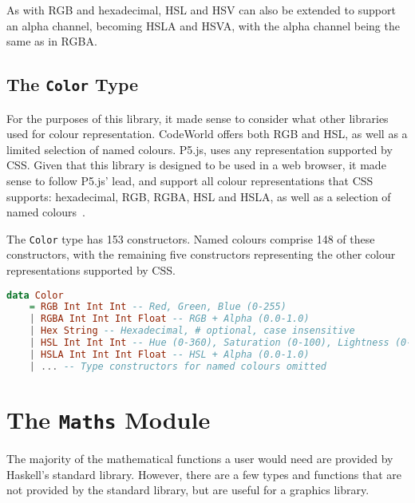 \documentclass[../main.tex]{subfiles}
\begin{document}
                As with RGB and hexadecimal, HSL and HSV can also be extended to support an
                    alpha channel, becoming HSLA and HSVA, with the alpha channel being the same as
                    in RGBA.

        \subsection{The \texttt{Color}
            Type} For the purposes of this library, it made sense to consider what other
                libraries used for colour representation.
            CodeWorld offers both RGB and HSL, as well as a limited selection of named
                colours.
            P5.js, uses any representation supported by CSS.
            Given that this library is designed to be used in a web browser, it made sense
                to follow P5.js' lead, and support all colour representations that CSS
                supports: hexadecimal, RGB, RGBA, HSL and HSLA, as well as a selection of named
                colours~\citep{cssColours}.

            The \texttt{Color} type has 153 constructors.
            Named colours comprise 148 of these constructors, with the remaining five
                constructors representing the other colour representations supported by CSS.

            \begin{lstlisting}[language={Haskell}, label={lst:color}, caption={The \texttt{Color} 
                type definition.
                Named colours have been omitted, but are included in the actual implementation (see 
                Appendix~\ref{app:code}).}]
data Color
    = RGB Int Int Int -- Red, Green, Blue (0-255)
    | RGBA Int Int Int Float -- RGB + Alpha (0.0-1.0)
    | Hex String -- Hexadecimal, # optional, case insensitive
    | HSL Int Int Int -- Hue (0-360), Saturation (0-100), Lightness (0-100)
    | HSLA Int Int Int Float -- HSL + Alpha (0.0-1.0)
    | ... -- Type constructors for named colours omitted\end{lstlisting}

    \section{The \texttt{Maths}
        Module} The majority of the mathematical functions a user would need are
            provided by Haskell's standard library.
        However, there are a few types and functions that are not provided by the
            standard library, but are useful for a graphics library.
\end{document}
